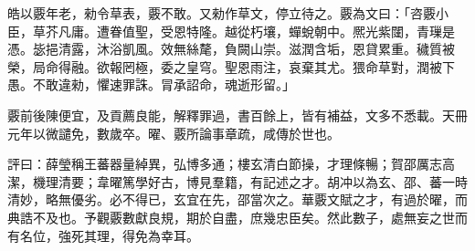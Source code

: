 \begin{pinyinscope}
皓以覈年老，勑令草表，覈不敢。又勑作草文，停立待之。覈為文曰：「咨覈小臣，草芥凡庸。遭眷值聖，受恩特隆。越從朽壤，蟬蛻朝中。熈光紫闥，青璅是憑。毖挹清露，沐浴凱風。效無絲氂，負闕山崇。滋潤含垢，恩貸累重。穢質被榮，局命得融。欲報罔極，委之皇穹。聖恩雨注，哀棄其尤。猥命草對，潤被下愚。不敢違勑，懼速罪誅。冐承詔命，魂逝形留。」

覈前後陳便宜，及貢薦良能，解釋罪過，書百餘上，皆有補益，文多不悉載。天冊元年以微譴免，數歲卒。曜、覈所論事章疏，咸傳於世也。

評曰：薛瑩稱王蕃器量綽異，弘博多通；樓玄清白節操，才理條暢；賀邵厲志高潔，機理清要；韋曜篤學好古，博見羣籍，有記述之才。胡冲以為玄、邵、蕃一時清妙，略無優劣。必不得已，玄宜在先，邵當次之。華覈文賦之才，有過於曜，而典誥不及也。予觀覈數獻良規，期於自盡，庶幾忠臣矣。然此數子，處無妄之世而有名位，強死其理，得免為幸耳。


\end{pinyinscope}